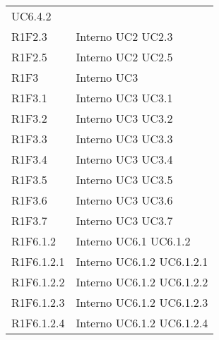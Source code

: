 \begin{longtable}{p{2.5cm}!{\VRule[1pt]}p{2.5cm}}
 \newline UC6.4.2
 \\
R1F2.3 & Interno \newline UC2
 \newline UC2.3
 \\
R1F2.5 & Interno \newline UC2
 \newline UC2.5
 \\
R1F3 & Interno \newline UC3
 \\
R1F3.1 & Interno \newline UC3
 \newline UC3.1
 \\
R1F3.2 & Interno \newline UC3
 \newline UC3.2
 \\
R1F3.3 & Interno \newline UC3
 \newline UC3.3
 \\
R1F3.4 & Interno \newline UC3
 \newline UC3.4
 \\
R1F3.5 & Interno \newline UC3
 \newline UC3.5
 \\
R1F3.6 & Interno \newline UC3
 \newline UC3.6
 \\
R1F3.7 & Interno \newline UC3
 \newline UC3.7
 \\
R1F6.1.2 & Interno \newline UC6.1
 \newline UC6.1.2
 \\
R1F6.1.2.1 & Interno \newline UC6.1.2
 \newline UC6.1.2.1
 \\
R1F6.1.2.2 & Interno \newline UC6.1.2
 \newline UC6.1.2.2
 \\
R1F6.1.2.3 & Interno \newline UC6.1.2
 \newline UC6.1.2.3
 \\
R1F6.1.2.4 & Interno \newline UC6.1.2
 \newline UC6.1.2.4

\end{longtable}
